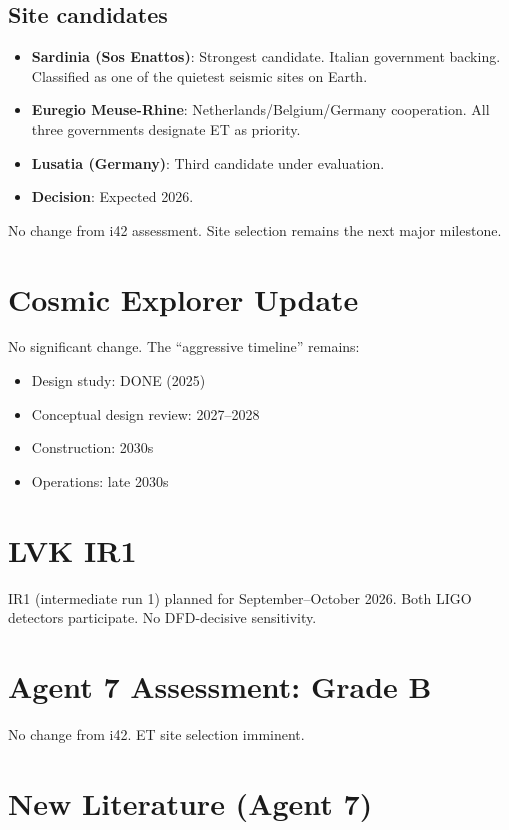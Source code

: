 \documentclass[11pt,a4paper]{article}
\begin{document}
\subsection{Site candidates}

\begin{itemize}
\item \textbf{Sardinia (Sos Enattos)}: Strongest candidate. Italian government backing. Classified as one of the quietest seismic sites on Earth.
\item \textbf{Euregio Meuse-Rhine}: Netherlands/Belgium/Germany cooperation. All three governments designate ET as priority.
\item \textbf{Lusatia (Germany)}: Third candidate under evaluation.
\item \textbf{Decision}: Expected 2026.
\end{itemize}

No change from i42 assessment. Site selection remains the next major milestone.

\section{Cosmic Explorer Update}

No significant change. The ``aggressive timeline'' remains:
\begin{itemize}
\item Design study: DONE (2025)
\item Conceptual design review: 2027--2028
\item Construction: 2030s
\item Operations: late 2030s
\end{itemize}

\section{LVK IR1}

IR1 (intermediate run 1) planned for September--October 2026. Both LIGO detectors participate. No DFD-decisive sensitivity.

\section{Agent 7 Assessment: Grade B}

No change from i42. ET site selection imminent.

\section{New Literature (Agent 7)}
\end{document}
